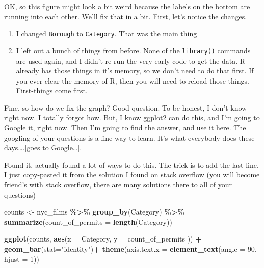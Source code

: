 \documentclass[
]{book}
\newenvironment{Shaded}{\begin{snugshade}}{\end{snugshade}}
\newcommand{\AttributeTok}[1]{\textcolor[rgb]{0.13,0.29,0.53}{#1}}
\newcommand{\DecValTok}[1]{\textcolor[rgb]{0.00,0.00,0.81}{#1}}
\newcommand{\FunctionTok}[1]{\textcolor[rgb]{0.13,0.29,0.53}{\textbf{#1}}}
\newcommand{\NormalTok}[1]{#1}
\newcommand{\OtherTok}[1]{\textcolor[rgb]{0.56,0.35,0.01}{#1}}
\newcommand{\SpecialCharTok}[1]{\textcolor[rgb]{0.81,0.36,0.00}{\textbf{#1}}}
\newcommand{\StringTok}[1]{\textcolor[rgb]{0.31,0.60,0.02}{#1}}
\begin{document}
OK, so this figure might look a bit weird because the labels on the bottom are running into each other. We'll fix that in a bit. First, let's notice the changes.

\begin{enumerate}
\def\labelenumi{\arabic{enumi}.}
\item
  I changed \texttt{Borough} to \texttt{Category}. That was the main thing
\item
  I left out a bunch of things from before. None of the \texttt{library()} commands are used again, and I didn't re-run the very early code to get the data. R already has those things in it's memory, so we don't need to do that first. If you ever clear the memory of R, then you will need to reload those things. First-things come first.
\end{enumerate}

Fine, so how do we fix the graph? Good question. To be honest, I don't know right now. I totally forgot how. But, I know ggplot2 can do this, and I'm going to Google it, right now. Then I'm going to find the answer, and use it here. The googling of your questions is a fine way to learn. It's what everybody does these days\ldots.{[}goes to Google\ldots{]}.

Found it, actually found a lot of ways to do this. The trick is to add the last line. I just copy-pasted it from the solution I found on \href{https://stackoverflow.com/questions/1330989/rotating-and-spacing-axis-labels-in-ggplot2}{stack overflow} (you will become friend's with stack overflow, there are many solutions there to all of your questions)

\begin{Shaded}
\begin{Highlighting}[]
\NormalTok{counts }\OtherTok{\textless{}{-}}\NormalTok{ nyc\_films }\SpecialCharTok{\%\textgreater{}\%}
          \FunctionTok{group\_by}\NormalTok{(Category) }\SpecialCharTok{\%\textgreater{}\%}
          \FunctionTok{summarize}\NormalTok{(}\AttributeTok{count\_of\_permits =} \FunctionTok{length}\NormalTok{(Category))}

\FunctionTok{ggplot}\NormalTok{(counts, }\FunctionTok{aes}\NormalTok{(}\AttributeTok{x =}\NormalTok{ Category, }\AttributeTok{y =}\NormalTok{ count\_of\_permits )) }\SpecialCharTok{+}
  \FunctionTok{geom\_bar}\NormalTok{(}\AttributeTok{stat=}\StringTok{"identity"}\NormalTok{)}\SpecialCharTok{+} 
  \FunctionTok{theme}\NormalTok{(}\AttributeTok{axis.text.x =} \FunctionTok{element\_text}\NormalTok{(}\AttributeTok{angle =} \DecValTok{90}\NormalTok{, }\AttributeTok{hjust =} \DecValTok{1}\NormalTok{))}
\end{Highlighting}
\end{Shaded}
\end{document}
